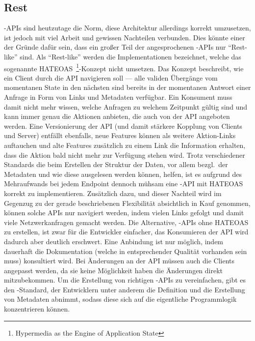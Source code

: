 \subsection{Rest}
-APIs sind heutzutage die Norm, diese Architektur allerdings korrekt umzusetzen, ist jedoch mit viel Arbeit und gewissen Nachteilen verbunden. Dies könnte einer der Gründe dafür sein, dass ein großer Teil der angesprochenen -APIs nur ``Rest-like'' sind. Als ``Rest-like'' werden die Implementationen bezeichnet, welche das sogenannte HATEOAS~\footnote{Hypermedia as the Engine of Application State}-Konzept nicht umsetzen. Das Konzept beschreibt, wie ein Client durch die API navigieren soll --- alle validen Übergänge vom momentanen State in den nächsten sind bereits in der momentanen Antwort einer Anfrage in Form von Links und Metadaten verfügbar. Ein Konsument muss damit nicht mehr wissen, welche Anfragen zu welchem Zeitpunkt gültig sind und kann immer genau die Aktionen anbieten, die auch von der API angeboten werden. Eine Versionierung der API (und damit stärkere Kopplung von Clients und Server) entfällt ebenfalls, neue Features können als weitere Aktion-Links auftauchen und alte Features zusätzlich zu einem Link die Information erhalten, dass die Aktion bald nicht mehr zur Verfügung stehen wird. Trotz verschiedener Standards die beim Erstellen der Struktur der Daten, vor allem bezgl.\ der Metadaten und wie diese ausgelesen werden können, helfen, ist es aufgrund des Mehraufwands bei jedem Endpoint dennoch mühsam eine -API mit HATEOAS korrekt zu implementieren. Zusätzlich dazu, und dieser Nachteil wird im Gegenzug zu der gerade beschriebenen Flexibilität absichtlich in Kauf genommen, können solche APIs nur navigiert werden, indem vielen Links gefolgt und damit viele Netzwerkanfragen gemacht werden. 
Die Alternative, -APIs ohne HATEOAS zu erstellen, ist zwar für die Entwickler einfacher, das Konsumieren der API wird dadurch aber deutlich erschwert. Eine Anbindung ist nur möglich, indem dauerhaft die Dokumentation (welche in entsprechender Qualität vorhanden sein muss) konsultiert wird. Bei Änderungen an der API müssen auch die Clients angepasst werden, da sie keine Möglichkeit haben die Änderungen direkt mitzubekommen.
Um die Erstellung von richtigen -APIs zu vereinfachen, gibt es den -Standard, der Entwicklern unter anderem die Definition und die Erstellung von Metadaten abnimmt, sodass diese sich auf die eigentliche Programmlogik konzentrieren können.
